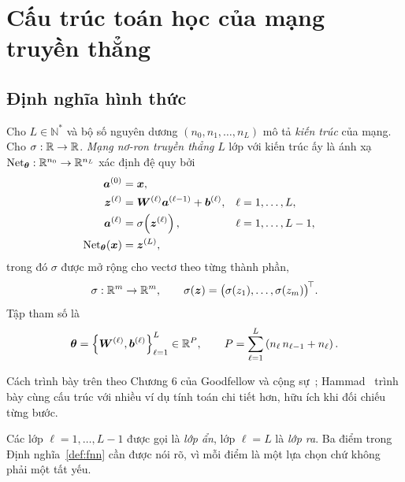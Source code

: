 \section{Cấu trúc toán học của mạng truyền thẳng}
\label{sec:cautruc}
 
\subsection{Định nghĩa hình thức}
\label{subsec:dinh-nghia}
 
\begin{definition}
\label{def:fnn}
Cho $L \in \mathbb{N}^{*}$ và bộ số nguyên dương $(n_0, n_1, \dots, n_L)$ mô tả
\emph{kiến trúc} của mạng. Cho $\sigma : \mathbb{R} \to \mathbb{R}$. \emph{Mạng nơ-ron truyền
thẳng} $L$ lớp với kiến trúc ấy là ánh xạ
$\operatorname{Net}_{\bm{\theta}} : \mathbb{R}^{n_0} \to \mathbb{R}^{n_L}$ xác định đệ quy bởi
\begin{align}
\bm{a}^{(0)} &= \bm{x}, \label{eq:fnn-input}\\
\bm{z}^{(\ell)} &= \bm{W}^{(\ell)} \bm{a}^{(\ell-1)} + \bm{b}^{(\ell)},
  && \ell = 1, \dots, L, \label{eq:fnn-affine}\\
\bm{a}^{(\ell)} &= \sigma\!\left( \bm{z}^{(\ell)} \right),
  && \ell = 1, \dots, L-1, \label{eq:fnn-act}\\
\operatorname{Net}_{\bm{\theta}}(\bm{x}) &= \bm{z}^{(L)}, \label{eq:fnn-output}
\end{align}
trong đó $\sigma$ được mở rộng cho vectơ theo từng thành phần,
\begin{equation}
\sigma : \mathbb{R}^{m} \to \mathbb{R}^{m}, \qquad
\sigma(\bm{z}) = \big(\sigma(z_1),\dots,\sigma(z_m)\big)^{\!\top}.
\label{eq:sigma-mo-rong}
\end{equation}
Tập tham số là
\begin{equation}
\bm{\theta} = \left\{ \bm{W}^{(\ell)}, \bm{b}^{(\ell)} \right\}_{\ell=1}^{L}
  \in \mathbb{R}^{P}, \qquad
P = \sum_{\ell=1}^{L} \left( n_\ell\, n_{\ell-1} + n_\ell \right).
\label{eq:so-tham-so}
\end{equation}
\end{definition}
 
Cách trình bày trên theo Chương 6 của Goodfellow và cộng
sự~\cite{goodfellow2016}; Hammad~\cite{hammad2024} trình bày cùng cấu trúc với
nhiều ví dụ tính toán chi tiết hơn, hữu ích khi đối chiếu từng bước.

Các lớp $\ell = 1,\dots,L-1$ được gọi là \emph{lớp ẩn}, lớp $\ell = L$ là
\emph{lớp ra}. Ba điểm trong Định nghĩa~\ref{def:fnn} cần được nói rõ, vì mỗi
điểm là một lựa chọn chứ không phải một tất yếu.
 
